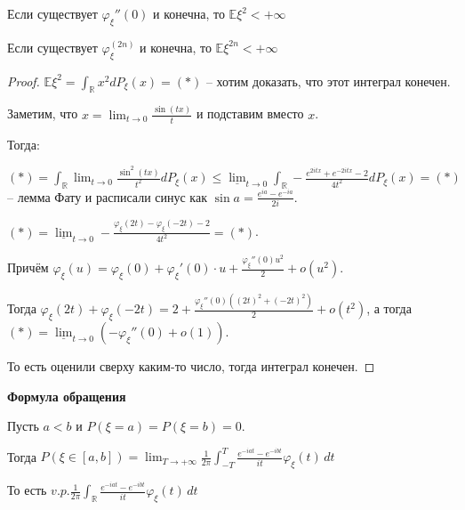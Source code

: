 \begin{theorem}
    Если существует $\varphi_{\xi}''(0)$ и конечна, то $\mathbb{E} \xi^2 < +\infty$
\end{theorem}

\begin{remark}
    Если существует $\varphi_{\xi}^{(2n)}$ и конечна, то $\mathbb{E} \xi^{2n} < +\infty$
\end{remark}

\begin{proof}
    $\mathbb{E} \xi^2 = \int_{\mathbb{R}} x^2 dP_{\xi} (x) = (*)$ -- хотим доказать, что этот интеграл конечен.

    Заметим, что $x = \lim_{t \to 0} \frac{\sin (tx)}{t}$ и подставим вместо $x$.

    Тогда:

    $(*) = \int_{\mathbb{R}} \lim_{t \to 0} \frac{\sin^2 (tx)}{t^2} dP_{\xi}(x) \leqslant
    \underline{\lim}_{t \to 0} \int_{\mathbb{R}} -\frac{e^{2itx} + e^{-2itx} - 2}{4t^2} dP_{\xi} (x) = (*)$ -- лемма Фату и расписали синус как $\sin{a} = \frac{e^{ia} - e^{-ia}}{2 i}$.

    $(*) = \underline{\lim}_{t \to 0} -\frac{\varphi_{\xi}(2t) - \varphi_{\xi}(-2t) - 2}{4t^2} = (*)$.

    Причём $\varphi_{\xi} (u) = \varphi_{\xi}(0) + \varphi_{\xi}'(0) \cdot u + \frac{\varphi_{\xi}''(0) u^2}{2} + o(u^2)$.

    Тогда $\varphi_{\xi}(2t) + \varphi_{\xi}(-2t) = 2 + \frac{\varphi_{\xi}''(0) \left((2t)^2 + (-2t)^2 \right)}{2} + o(t^2)$, а тогда $(*) = \underline{\lim}_{t \to 0} (-\varphi_{\xi}''(0) + o(1))$.

    То есть оценили сверху каким-то число, тогда интеграл конечен.
\end{proof}

\begin{theorem}
    \textbf{Формула обращения}

    Пусть $a < b$ и $P(\xi = a) = P(\xi = b) = 0$.

    Тогда $P(\xi \in [a, b]) = \lim_{T \to +\infty} \frac{1}{2\pi} \int_{-T}^{T} \frac{e^{-iat} - e^{-ibt}}{it} \varphi_{\xi}(t) \, dt $

    То есть $v.p. \frac{1}{2\pi} \int_{\mathbb{R}} \frac{e^{-iat} - e^{-ibt}}{it} \varphi_{\xi}(t) \, dt$
\end{theorem}

